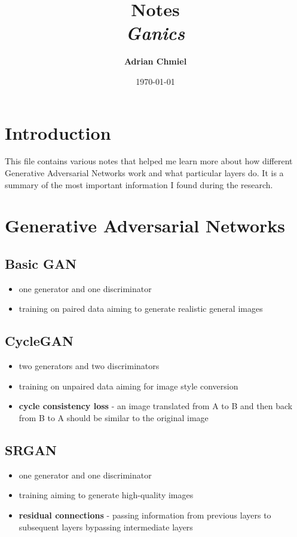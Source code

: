 \documentclass{article}
\begin{document}
\title{\textbf{Notes}
\\ \large{\textit{Ganics}}}
\author{\textbf{Adrian Chmiel}}
\date{\today}
\maketitle

\section{Introduction}
This file contains various notes that helped me learn more about how different Generative Adversarial Networks work and what particular layers do. It is a summary of the most important information I found during the research.

\section{Generative Adversarial Networks}
\subsection{Basic GAN}
\begin{itemize}
    \item one generator and one discriminator
    \item training on paired data aiming to generate realistic general images
\end{itemize}

\subsection{CycleGAN}
\begin{itemize}
    \item two generators and two discriminators
    \item training on unpaired data aiming for image style conversion
    \item \textbf{cycle consistency loss} - an image translated from A to B and then back from B to A should be similar to the original image
\end{itemize}

\subsection{SRGAN}
\begin{itemize}
    \item one generator and one discriminator
    \item training aiming to generate high-quality images
    \item \textbf{residual connections} - passing information from previous layers to subsequent layers bypassing intermediate layers
\end{itemize}
\end{document}
